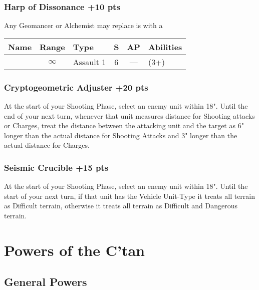 \subsubsection[Harp of Dissonance ]{Harp of Dissonance  \hrulefill +10 pts}

Any Geomancer or Alchemist may replace is  with a 

\label{Harp of Dissonance}
\noindent
\begin{NiceTabular}{L{115 pt} c C{40pt} *{2}{c} >{\raggedright\arraybackslash}p{240pt}}
	Name & Range & Type & S & AP & Abilities \\
	\hline
	 & $\infty$ & Assault 1 & 6 & — &  (3+) \\
\end{NiceTabular}

\subsubsection[Cryptogeometric Adjuster]{Cryptogeometric Adjuster  \hrulefill +20 pts}

At the start of your Shooting Phase, select an enemy unit within 18". Until the end of your next turn, whenever that unit measures distance for Shooting attacks or Charges, treat the distance between the attacking unit and the target as 6" longer than the actual distance for Shooting Attacks and 3" longer than the actual distance for Charges.


\subsubsection[Seismic Crucible]{Seismic Crucible \hrulefill +15 pts}

At the start of your Shooting Phase, select an enemy unit within 18". Until the start of your next turn, if that unit has the Vehicle Unit-Type it treats all terrain as Difficult terrain, otherwise it treats all terrain as Difficult and Dangerous terrain.


\section{Powers of the C'tan} \label{Powers of the C'tan}

\subsection{General Powers}

